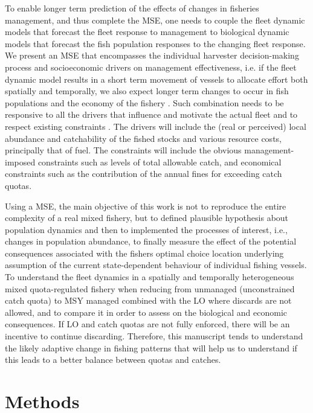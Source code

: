 \documentclass[12pt,oneline,a4paper,numbib]{ouparticle}
\numberwithin{equation}{subsection} %
\begin{document}
To enable longer term prediction of the effects of changes in fisheries management, and thus complete the MSE, one needs to couple the fleet dynamic models that forecast the fleet response to management to  biological dynamic models that forecast the fish population responses to the changing fleet response. We present an MSE that encompasses the individual harvester decision-making process and socioeconomic drivers on management effectiveness, i.e. if the fleet dynamic model results in a short term movement of vessels to allocate effort both spatially and temporally, we also expect longer term changes to occur in fish populations and the economy of the fishery \cite{Alzorriz2018}. Such combination needs to be responsive to all the drivers that influence and motivate the actual fleet and to respect existing constraints \cite{Venables2009}. The drivers will include the (real or perceived) local abundance and catchability of the fished stocks and various resource costs, principally that of fuel. The constraints will include the obvious management-imposed constraints such as levels of total allowable catch, and economical constraints such as the contribution of the annual fines for exceeding catch quotas.

Using a MSE, the main objective of this work is not to reproduce the entire complexity of a real mixed fishery, but to defined plausible hypothesis about population dynamics and then to implemented the processes of interest, i.e., changes in population abundance, to finally measure the effect of the potential consequences associated with the fishers optimal choice location underlying assumption of the current state-dependent behaviour of individual fishing vessels. To understand the fleet dynamics in a spatially and temporally heterogeneous mixed quota-regulated fishery when reducing from unmanaged (unconstrained catch quota) to MSY managed combined with the LO where discards are not allowed, and to compare it in order to assess on the biological and economic consequences. If LO and catch quotas are not fully enforced, there will be an incentive to continue discarding. Therefore, this manuscript tends to understand the likely adaptive change in fishing patterns that will help us to understand if this leads to a better balance between quotas and catches.



\section{Methods}
\end{document}
